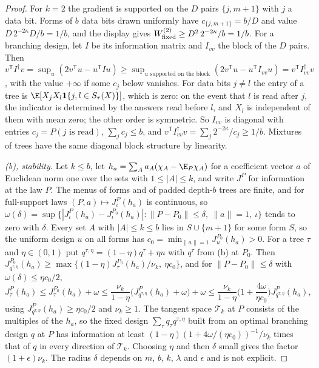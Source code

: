 \begin{proof}
For $k=2$ the gradient is supported on the $D$ pairs $\{j,m+1\}$ with $j$ a
data bit. Forms of $b$ data bits drawn uniformly have $c_{\{j,m+1\}}=b/D$ and
value $D\,2^{-2\kappa}D/b=1/b$, and the display gives
$W^{(2)}_{\rm fixed}\ge D^2\,2^{-2\kappa}/b=1/b$. For a branching design, let
$I$ be its information matrix and $I_{vv}$ the block of the $D$ pairs. Then
$v^{\mathsf T}I^\dagger v=\sup_u(2v^{\mathsf T}u-u^{\mathsf T}Iu)\ge\sup_{u\text{ supported on the block}}(2v^{\mathsf T}u-u^{\mathsf T}I_{vv}u)=v^{\mathsf T}I_{vv}^{\dagger}v$,
with the value $+\infty$ if some $c_j$ below vanishes.
For data bits $j\ne l$ the entry of a tree is
$\E[X_jX_l\mathbf 1\{j,l\in S_\tau(X)\}]$, which is zero: on the event that $l$
is read after $j$, the indicator is determined by the answers read before
$l$, and $X_l$ is independent of them with mean zero; the other order is
symmetric. So $I_{vv}$ is diagonal with entries $c_j=P(j\text{ is read})$,
$\sum_jc_j\le b$, and $v^{\mathsf T}I_{vv}^{\dagger}v=\sum_j2^{-2\kappa}/c_j\ge1/b$.
Mixtures of trees have the same diagonal block structure by linearity.

\emph{(b), stability.} Let $k\le b$, let $h_a=\sum_Aa_A(\chi_A-\E_P\chi_A)$
for a coefficient vector $a$ of Euclidean norm one over the sets with
$1\le|A|\le k$, and write $J^P$ for information at the law $P$. The menus of
forms and of padded depth-$b$ trees are finite, and for full-support laws
$(P,a)\mapsto J^P_\iota(h_a)$ is continuous, so
$\omega(\delta)=\sup\{|J^P_\iota(h_a)-J^{P_0}_\iota(h_a)|:\|P-P_0\|\le\delta,\ \|a\|=1,\ \iota\}$
tends to zero with $\delta$. Every set $A$ with $|A|\le k\le b$ lies in
$S\cup\{m+1\}$ for some form $S$, so the uniform design $u$ on all forms has
$c_0=\min_{\|a\|=1}J^{P_0}_u(h_a)>0$. For a tree $\tau$ and $\eta\in(0,1)$ put
$q^{\tau,\eta}=(1-\eta)q^\tau+\eta u$ with $q^\tau$ from (b) at $P_0$. Then
$J^{P_0}_{q^{\tau,\eta}}(h_a)\ge\max\{(1-\eta)J^{P_0}_\tau(h_a)/\nu_k,\ \eta c_0\}$,
and for $\|P-P_0\|\le\delta$ with $\omega(\delta)\le\eta c_0/2$,
\[
 J^P_\tau(h_a)\le J^{P_0}_\tau(h_a)+\omega\le\frac{\nu_k}{1-\eta}\big(J^P_{q^{\tau,\eta}}(h_a)+\omega\big)+\omega
 \le\frac{\nu_k}{1-\eta}\Big(1+\frac{4\omega}{\eta c_0}\Big)J^P_{q^{\tau,\eta}}(h_a),
\]
using $J^P_{q^{\tau,\eta}}(h_a)\ge\eta c_0/2$ and $\nu_k\ge1$. The tangent
space $\mathcal T_k$ at $P$ consists of the multiples of the $h_a$, so the
fixed design $\sum_\tau q_\tau q^{\tau,\eta}$ built from an optimal branching
design $q$ at $P$ has information at least
$(1-\eta)(1+4\omega/(\eta c_0))^{-1}/\nu_k$ times that of $q$ in every
direction of $\mathcal T_k$. Choosing $\eta$ and then $\delta$ small gives
the factor $(1+\epsilon)\nu_k$. The radius $\delta$ depends on $m$, $b$, $k$,
$\lambda$ and $\epsilon$ and is not explicit.


\end{proof}

